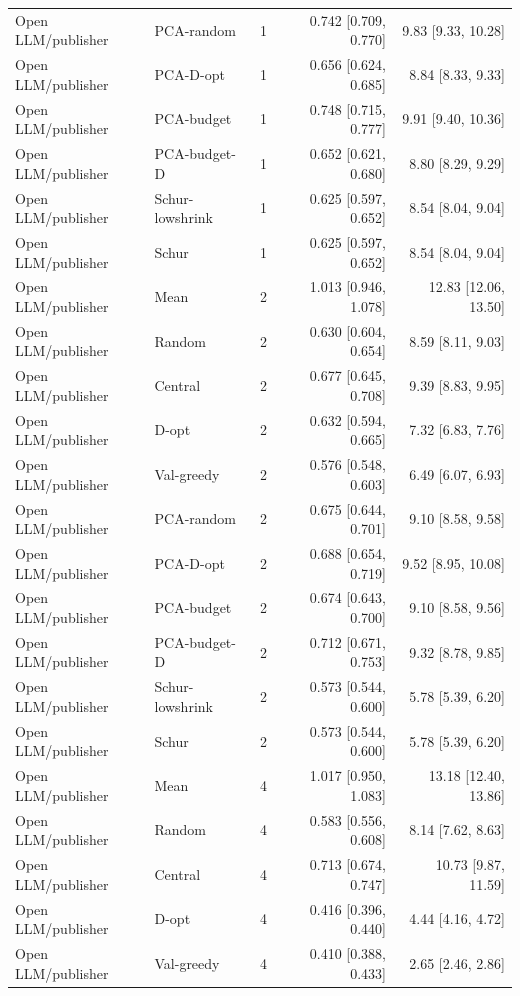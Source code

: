 \begin{longtable}{lllrr}
Open LLM/publisher & PCA-random & 1 & 0.742 [0.709, 0.770] & 9.83 [9.33, 10.28]\\
Open LLM/publisher & PCA-D-opt & 1 & 0.656 [0.624, 0.685] & 8.84 [8.33, 9.33]\\
Open LLM/publisher & PCA-budget & 1 & 0.748 [0.715, 0.777] & 9.91 [9.40, 10.36]\\
Open LLM/publisher & PCA-budget-D & 1 & 0.652 [0.621, 0.680] & 8.80 [8.29, 9.29]\\
Open LLM/publisher & Schur-lowshrink & 1 & 0.625 [0.597, 0.652] & 8.54 [8.04, 9.04]\\
Open LLM/publisher & Schur & 1 & 0.625 [0.597, 0.652] & 8.54 [8.04, 9.04]\\
Open LLM/publisher & Mean & 2 & 1.013 [0.946, 1.078] & 12.83 [12.06, 13.50]\\
Open LLM/publisher & Random & 2 & 0.630 [0.604, 0.654] & 8.59 [8.11, 9.03]\\
Open LLM/publisher & Central & 2 & 0.677 [0.645, 0.708] & 9.39 [8.83, 9.95]\\
Open LLM/publisher & D-opt & 2 & 0.632 [0.594, 0.665] & 7.32 [6.83, 7.76]\\
Open LLM/publisher & Val-greedy & 2 & 0.576 [0.548, 0.603] & 6.49 [6.07, 6.93]\\
Open LLM/publisher & PCA-random & 2 & 0.675 [0.644, 0.701] & 9.10 [8.58, 9.58]\\
Open LLM/publisher & PCA-D-opt & 2 & 0.688 [0.654, 0.719] & 9.52 [8.95, 10.08]\\
Open LLM/publisher & PCA-budget & 2 & 0.674 [0.643, 0.700] & 9.10 [8.58, 9.56]\\
Open LLM/publisher & PCA-budget-D & 2 & 0.712 [0.671, 0.753] & 9.32 [8.78, 9.85]\\
Open LLM/publisher & Schur-lowshrink & 2 & 0.573 [0.544, 0.600] & 5.78 [5.39, 6.20]\\
Open LLM/publisher & Schur & 2 & 0.573 [0.544, 0.600] & 5.78 [5.39, 6.20]\\
Open LLM/publisher & Mean & 4 & 1.017 [0.950, 1.083] & 13.18 [12.40, 13.86]\\
Open LLM/publisher & Random & 4 & 0.583 [0.556, 0.608] & 8.14 [7.62, 8.63]\\
Open LLM/publisher & Central & 4 & 0.713 [0.674, 0.747] & 10.73 [9.87, 11.59]\\
Open LLM/publisher & D-opt & 4 & 0.416 [0.396, 0.440] & 4.44 [4.16, 4.72]\\
Open LLM/publisher & Val-greedy & 4 & 0.410 [0.388, 0.433] & 2.65 [2.46, 2.86]\\

\end{longtable}
